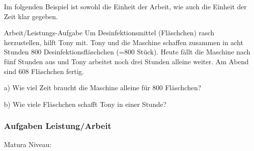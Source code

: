 \newpage

Im folgenden Beispiel ist sowohl die Einheit der Arbeit, wie auch die
Einheit der Zeit klar gegeben.

\begin{beispiel}{Arbeit/Leistungs-Aufgabe}{}
  Um Desinfektionsmittel (Fläschchen) rasch herzustellen, hilft Tony mit.
  Tony und die Maschine schaffen zusammen in acht Stunden 800
  Desinfektionsfläschchen (=800 Stück).
  Heute fällt die Maschine nach fünf Stunden aus und Tony arbeitet noch
  drei Stunden alleine weiter. Am Abend sind 608 Fläschchen fertig.

  a) Wie viel Zeit braucht die Maschine alleine für 800 Fläschchen?

  b) Wie viele Fläschchen schafft Tony in einer Stunde?
\end{beispiel}


\subsubsection*{Aufgaben Leistung/Arbeit}
Matura Niveau:

\newpage
{}%
